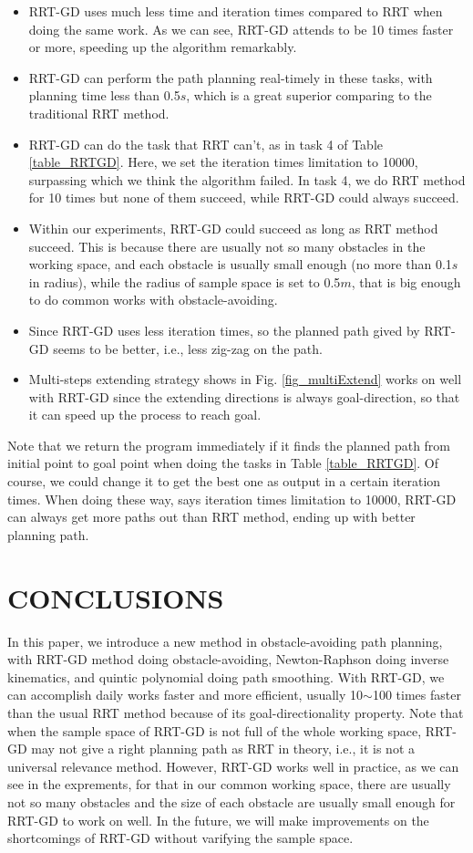 \documentclass[letterpaper, 10 pt, conference]{ieeeconf}  %
\begin{document}
\begin{itemize}

\item RRT-GD uses much less time and iteration times compared to RRT when doing the same work. As we can see, RRT-GD attends to be 10 times faster or more, speeding up the algorithm remarkably.
\item RRT-GD can perform the path planning real-timely in these tasks, with planning time less than 0.5$s$, which is a great superior comparing to the traditional RRT method.
\item RRT-GD can do the task that RRT can't, as in task 4 of Table \ref{table_RRTGD}. Here, we set the iteration times limitation to 10000,  surpassing which we think the algorithm failed. In task 4, we do RRT method for 10 times but none of them succeed, while RRT-GD could always succeed.
\item Within our experiments, RRT-GD could succeed as long as RRT method succeed. This is because there are usually not so many obstacles in the working space, and each obstacle is usually small enough (no more than 0.1$s$ in radius), while the radius of sample space is set to 0.5$m$, that is big enough to do common works with obstacle-avoiding.
\item Since RRT-GD uses less iteration times, so the planned path gived by RRT-GD seems to be better, i.e., less zig-zag on the path.
\item Multi-steps extending strategy shows in Fig. \ref{fig_multiExtend} works on well with RRT-GD since the extending directions is always goal-direction, so that it can speed up the process to reach goal.
\end{itemize}

Note that we return the program immediately if it finds the planned path from initial point to goal point when doing the tasks in Table \ref{table_RRTGD}. Of course, we could change it to get the best one as output in a certain iteration times. When doing these way, says iteration times limitation to 10000, RRT-GD can always get more paths out than RRT method, ending up with better planning path.

\section{CONCLUSIONS}

In this paper, we introduce a new method in obstacle-avoiding path planning, with RRT-GD method doing obstacle-avoiding, Newton-Raphson doing inverse kinematics, and quintic polynomial doing path smoothing. With RRT-GD, we can accomplish daily works faster and more efficient, usually 10$\sim$100 times faster than the usual RRT method because of its goal-directionality property. Note that when the sample space of RRT-GD is not full of the whole working space, RRT-GD may not give a right planning path as RRT in theory, i.e., it is not a universal relevance method. However, RRT-GD works well in practice, as we can see in the exprements, for that in our common working space, there are usually not so many obstacles and the size of each obstacle are usually small enough for RRT-GD to work on well. In the future, we will make improvements on the shortcomings of RRT-GD without varifying the sample space.
\end{document}
